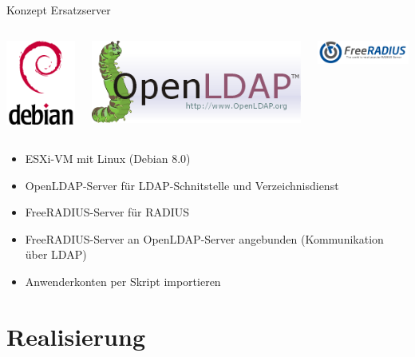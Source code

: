 \documentclass[handout,svgnames]{beamer}
\begin{document}
\begin{frame}{Konzept Ersatzserver}
\begin{columns}[c]
\centering
	\begin{column}{0.5cm}
		\includegraphics[scale=0.3]{Bilder/debian-openlogo-100.png}
	\end{column}
	\begin{column}{1.5cm}
		\includegraphics[scale=0.25]{Bilder/OpenLDAP-logo.png}
	\end{column}
	\begin{column}{2.5cm}
		\includegraphics[width=3.5cm]{Bilder/Freeradius_logo.png} 
	\end{column}
\end{columns}
\begin{itemize}
	\item ESXi-VM mit Linux (Debian 8.0)
	\item OpenLDAP-Server für LDAP-Schnitstelle und Verzeichnisdienst
	\item FreeRADIUS-Server für RADIUS
	\item FreeRADIUS-Server an OpenLDAP-Server angebunden (Kommunikation über LDAP)
	\item Anwenderkonten per Skript importieren
\end{itemize}
\end{frame}


\section{Realisierung}
\end{document}
